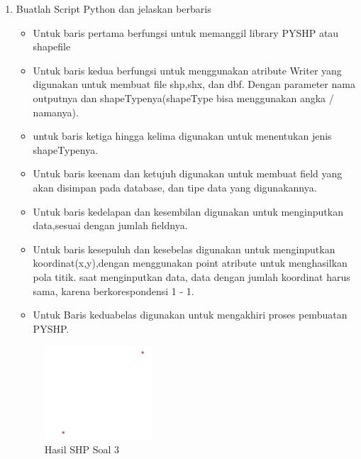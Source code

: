 \begin{enumerate}
	\item Buatlah Script Python dan jelaskan berbaris
	
	\begin{itemize}
		\item Untuk baris pertama berfungsi untuk memanggil library PYSHP atau shapefile
		\item Untuk baris kedua berfungsi untuk menggunakan atribute Writer yang digunakan untuk membuat file shp,shx, dan dbf. \hfill\break Dengan parameter nama outputnya dan shapeTypenya(shapeType bisa menggunakan angka / namanya).
		\item untuk baris ketiga hingga kelima digunakan untuk menentukan jenis shapeTypenya.
		\item Untuk baris keenam dan ketujuh digunakan untuk membuat field yang akan disimpan pada database, dan tipe data yang digunakannya.
		\item Untuk baris kedelapan dan kesembilan digunakan untuk menginputkan data,sesuai dengan jumlah fieldnya.
		\item Untuk baris kesepuluh dan kesebelas digunakan untuk menginputkan koordinat(x,y),dengan menggunakan point atribute untuk menghasilkan pola titik. \hfill\break
		saat menginputkan data, data dengan jumlah koordinat harus sama, karena berkorespondensi 1 - 1.
		\item Untuk Baris keduabelas digunakan untuk mengakhiri proses pembuatan PYSHP.
	\end{itemize}
	\hfill\break
	\begin{figure}[H]
		\includegraphics[width=4cm]{figures/1174002/2/3.png}
		\centering
		\caption{Hasil SHP Soal 3}
	\end{figure}


\end{enumerate}
